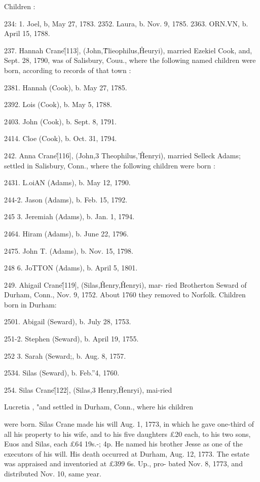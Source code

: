 Children : 

234: 1. Joel, b, May 27, 1783. 
2352. Laura, b. Nov. 9, 1785. 
2363. ORN.VN, b. April 15, 1788. 

237. Hannah Crane\^ [113], (John,\^ Tlieophilus,\^ Heuryi), 
married Ezekiel Cook, and, Sept. 28, 1790, was of Salisbury, 
Couu., where the following named children were born, according 
to records of that town : 

2381. Hannah (Cook), b. May 27, 1785. 

2392. Lois (Cook), b. May 5, 1788. 

2403. John (Cook), b. Sept. 8, 1791. 

2414. Cloe (Cook), b. Oct. 31, 1794. 

242. Anna Crane\^ [116], (John,3 Theophilus,'\^ Henryi), 
married Selleck Adams; settled in Salisbury, Conn., where the 
following children were born : 

2431. L.oiAN (Adams), b. May 12, 1790. 

244-2. Jason (Adams), b. Feb. 15, 1792. 

245  3. Jeremiah (Adams), b. Jan. 1, 1794. 

2464. Hiram (Adams), b. June 22, 1796. 

2475. John T. (Adams), b. Nov. 15, 1798. 

248  6. JoTTON (Adams), b. April 5, 1801. 

249. Ahigail Crane\^ [119], (Silas,\^ Henry,\^ Henryi), mar- 
ried Brotherton Seward of Durham, Conn., Nov. 9, 1752. About 
1760 they removed to Norfolk. Children born in Durham: 

2501. Abigail (Seward), b. July 28, 1753. 

251-2. Stephen (Seward), b. April 19, 1755. 

252  3. Sarah (Seward;, b. Aug. 8, 1757. 

2534. Silas (Seward), b. Feb.''4, 1760. 

254. Silas Crane\^ [122], (Silas,3 Henry,\^ Henryi), mai-ried 

Lucretia , "and settled in Durham, Conn., where his children 

were born. Silas Crane made his will Aug. 1, 1773, in which he 
gave one-third of all his property to his wife, and to his five 
daughters £20 each, to his two sons, Euos and Silas, each £64  
19s.-; 4p. He named his brother Jesse as one of the executors 
of his will. His death occurred at Durham, Aug. 12, 1773. The 
estate was appraised and inventoried at £399  6s.  Up., pro- 
bated Nov. 8, 1773, and distributed Nov. 10, same year. 

